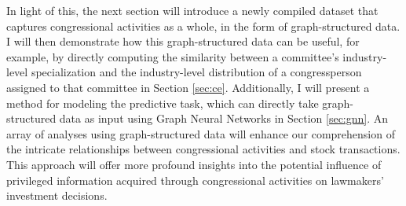 \documentclass[15pt,letterpaper]{article}
\begin{document}
In light of this, the next section will introduce a newly compiled dataset that captures congressional activities as a whole, in the form of graph-structured data. I will then demonstrate how this graph-structured data can be useful, for example, by directly computing the similarity between a committee's industry-level specialization and the industry-level distribution of a congressperson assigned to that committee in Section \ref{sec:ce}. Additionally, I will present a method for modeling the predictive task, which can directly take graph-structured data as input using Graph Neural Networks in Section \ref{sec:gnn}. 
An array of analyses using graph-structured data will enhance our comprehension of the intricate relationships between congressional activities and stock transactions. This approach will offer more profound insights into the potential influence of privileged information acquired through congressional activities on lawmakers' investment decisions.






\end{document}
